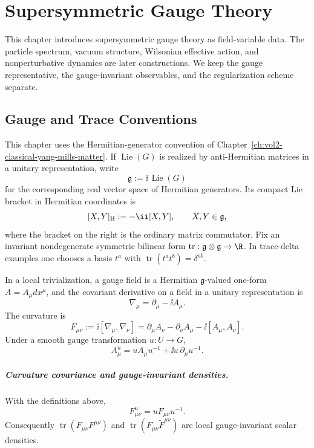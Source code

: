 \chapter{Supersymmetric Gauge Theory}
\label{ch:susy-gauge-theory}

\ConventionsLorentzian

This chapter introduces supersymmetric gauge theory as field-variable data.
The particle spectrum, vacuum structure, Wilsonian effective action, and
nonperturbative dynamics are later constructions.  We keep the gauge
representative, the gauge-invariant observables, and the regularization
scheme separate.

\section{Gauge and Trace Conventions}
\label{sec:susy-gauge-trace-conventions}

This chapter uses the Hermitian-generator convention of
Chapter~\ref{ch:vol2-classical-yang-mills-matter}.  If
\(\operatorname{Lie}(G)\) is realized by anti-Hermitian matrices in a unitary
representation, write
\[
  \mathfrak g:=\ii\,\operatorname{Lie}(G)
\]
for the corresponding real vector space of Hermitian generators.  Its compact
Lie bracket in Hermitian coordinates is
\[
  [X,Y]_{\rm H}:=-\ii[X,Y],
  \qquad X,Y\in\mathfrak g,
\]
where the bracket on the right is the ordinary matrix commutator.  Fix an
invariant nondegenerate symmetric bilinear form
\(\operatorname{tr}:\mathfrak g\otimes\mathfrak g\to\R\).  In trace-delta
examples one chooses a basis \(t^a\) with
\(\operatorname{tr}(t^a t^b)=\delta^{ab}\).

In a local trivialization, a gauge field is a Hermitian
\(\mathfrak g\)-valued one-form \(A=A_\mu dx^\mu\), and the covariant
derivative on a field in a unitary representation is
\[
  \nabla_\mu=\partial_\mu-\ii A_\mu .
\]
The curvature is
\[
  F_{\mu\nu}
  :=
  \ii[\nabla_\mu,\nabla_\nu]
  =
  \partial_\mu A_\nu-\partial_\nu A_\mu-\ii[A_\mu,A_\nu].
\]
Under a smooth gauge transformation \(u:U\to G\),
\[
  A_\mu^u=uA_\mu u^{-1}+\ii u\,\partial_\mu u^{-1}.
\]

\paragraph{Curvature covariance and gauge-invariant densities.}
With the definitions above,
\[
  F_{\mu\nu}^u=uF_{\mu\nu}u^{-1}.
\]
Consequently
\(\operatorname{tr}(F_{\mu\nu}F^{\mu\nu})\) and
\(\operatorname{tr}(F_{\mu\nu}\widetilde F^{\mu\nu})\) are local
gauge-invariant scalar densities.

